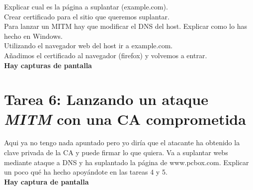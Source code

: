 \documentclass[10pt,a4paper]{article}
\begin{document}
Explicar cual es la página a suplantar (example.com).\\
Crear certificado para el sitio que queremos suplantar.\\
Para lanzar un MITM hay que modificar el DNS del host. Explicar como lo has hecho en Windows.\\
Utilizando el navegador web del host ir a example.com.\\
Añadimos el certificado al navegador (firefox) y volvemos a entrar.\\

\textbf{Hay capturas de pantalla}

\section{Tarea 6: Lanzando un ataque \emph{MITM} con una CA comprometida}

Aqui ya no tengo nada apuntado pero yo diría que el atacante ha obtenido la clave privada de la CA y puede firmar lo que quiera. Va a suplantar webs mediante ataque a DNS y ha suplantado la página de www.pcbox.com. Explicar un poco qué ha hecho apoyándote en las tareas 4 y 5.\\

\textbf{Hay captura de pantalla}
\end{document}

